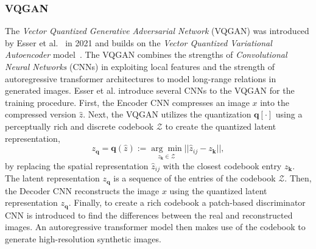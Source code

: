 \subsubsection{VQGAN}
\label{sec:wuerstchen:VQGAN}
The \emph{Vector Quantized Generative Adversarial Network} (VQGAN) was
introduced by Esser et al.~\cite{esser2021tamingtransformershighresolutionimage}
in 2021 and builds on the \emph{Vector Quantized Variational Autoencoder}
model~\cite{vdOord2017NeuralDiscreteRepresentationLearning}. The VQGAN combines
the strengths of \emph{Convolutional Neural Networks} (CNNs) in exploiting local
features and the strength of autoregressive transformer architectures
to model long-range relations in generated images. Esser et al. introduce
several CNNs to the VQGAN for the training procedure. First, the Encoder CNN
compresses an image $x$ into the compressed version $\hat{z}$. Next,
the VQGAN utilizes the quantization $\boldsymbol{q}[\cdot]$ using a
perceptually rich and discrete codebook $\mathcal{Z}$ to create the quantized
latent representation,
\begin{equation}
    z_{\boldsymbol{q}} = \boldsymbol{q}(\hat{z}) :=\underset{z_{\boldsymbol{k}}\in\mathcal{Z}}{\arg\min}||\hat{z}_{ij} - z_{\boldsymbol{k}}||,
\end{equation}
by replacing the spatial representation $\hat{z}_{ij}$ with the closest
codebook entry $z_{\boldsymbol{k}}$. The latent representation
$z_{\boldsymbol{q}}$ is a sequence of the entries of the codebook $\mathcal{Z}$.
Then, the Decoder CNN reconstructs the image $x$ using the quantized latent
representation $z_{\boldsymbol{q}}$. Finally, to create a rich codebook
a patch-based discriminator CNN is introduced to find the differences between
the real and reconstructed images. An autoregressive transformer model then
makes use of the codebook to generate high-resolution synthetic images.
